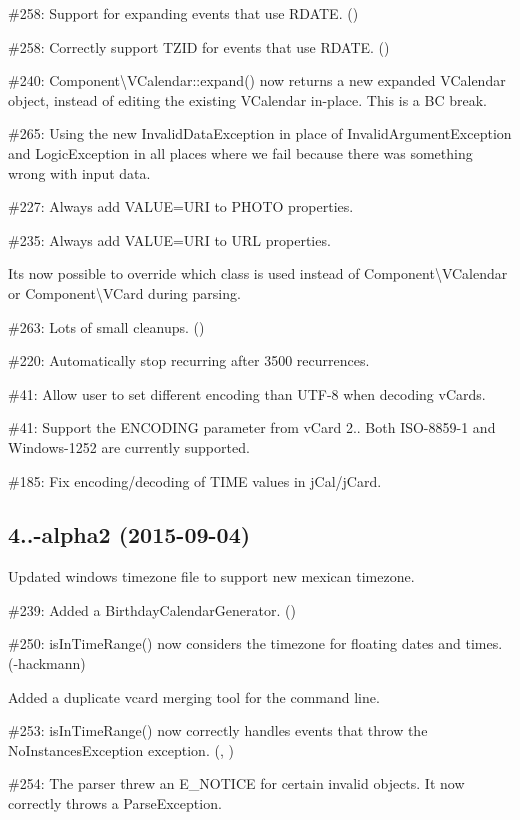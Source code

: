 \begin{DoxyItemize}
\item \#258\+: Support for expanding events that use {\ttfamily R\+D\+A\+TE}. ()
\item \#258\+: Correctly support T\+Z\+ID for events that use {\ttfamily R\+D\+A\+TE}. ()
\item \#240\+: {\ttfamily Component\textbackslash{}V\+Calendar\+::expand()} now returns a new expanded {\ttfamily V\+Calendar} object, instead of editing the existing {\ttfamily V\+Calendar} in-\/place. This is a BC break.
\item \#265\+: Using the new {\ttfamily Invalid\+Data\+Exception} in place of {\ttfamily Invalid\+Argument\+Exception} and {\ttfamily Logic\+Exception} in all places where we fail because there was something wrong with input data.
\item \#227\+: Always add {\ttfamily V\+A\+L\+UE=U\+RI} to {\ttfamily P\+H\+O\+TO} properties.
\item \#235\+: Always add {\ttfamily V\+A\+L\+UE=U\+RI} to {\ttfamily U\+RL} properties.
\item It\textquotesingle{}s now possible to override which class is used instead of {\ttfamily Component\textbackslash{}V\+Calendar} or {\ttfamily Component\textbackslash{}V\+Card} during parsing.
\item \#263\+: Lots of small cleanups. ()
\item \#220\+: Automatically stop recurring after 3500 recurrences.
\item \#41\+: Allow user to set different encoding than U\+T\+F-\/8 when decoding v\+Cards.
\item \#41\+: Support the {\ttfamily E\+N\+C\+O\+D\+I\+NG} parameter from v\+Card 2.. Both I\+S\+O-\/8859-\/1 and Windows-\/1252 are currently supported.
\item \#185\+: Fix encoding/decoding of {\ttfamily T\+I\+ME} values in j\+Cal/j\+Card.
\end{DoxyItemize}

\subsection*{4..-\/alpha2 (2015-\/09-\/04) }


\begin{DoxyItemize}
\item Updated windows timezone file to support new mexican timezone.
\item \#239\+: Added a {\ttfamily Birthday\+Calendar\+Generator}. ()
\item \#250\+: {\ttfamily is\+In\+Time\+Range()} now considers the timezone for floating dates and times. (-\/hackmann)
\item Added a duplicate vcard merging tool for the command line.
\item \#253\+: {\ttfamily is\+In\+Time\+Range()} now correctly handles events that throw the {\ttfamily No\+Instances\+Exception} exception. (, )
\item \#254\+: The parser threw an {\ttfamily E\+\_\+\+N\+O\+T\+I\+CE} for certain invalid objects. It now correctly throws a {\ttfamily Parse\+Exception}.
\end{DoxyItemize}

